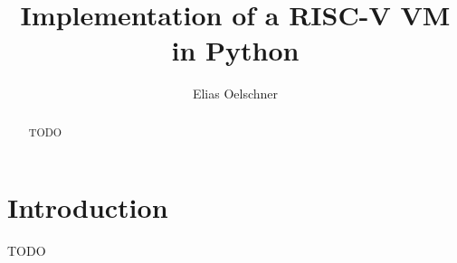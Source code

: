 \documentclass[sigconf]{acmart}
\begin{document}
\title{Implementation of a RISC-V VM in Python}

\author{Elias Oelschner}

\renewcommand{\shortauthors}{Oelschner}

\begin{abstract}
TODO
\end{abstract}

\maketitle

\section{Introduction}
TODO
\end{document}
